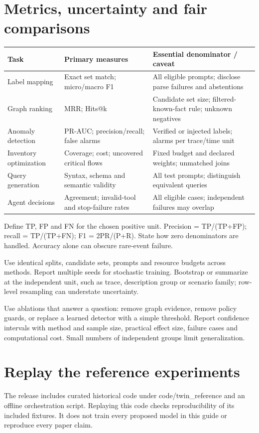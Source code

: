 \clearpage\section{Metrics, uncertainty and fair comparisons}
\begingroup\small\setlength{\tabcolsep}{5pt}\renewcommand{\arraystretch}{1.22}
\begin{tabularx}{\linewidth}{>{\raggedright\arraybackslash}X>{\raggedright\arraybackslash}X>{\raggedright\arraybackslash}X}
\toprule
\textbf{Task} & \textbf{Primary measures} & \textbf{Essential denominator / caveat}\\
\midrule
Label mapping & Exact set match; micro/macro F1 & All eligible prompts; disclose parse failures and abstentions\\
Graph ranking & MRR; Hits@k & Candidate set size; filtered-known-fact rule; unknown negatives\\
Anomaly detection & PR-AUC; precision/recall; false alarms & Verified or injected labels; alarms per trace/time unit\\
Inventory optimization & Coverage; cost; uncovered critical flows & Fixed budget and declared weights; unmatched joins\\
Query generation & Syntax, schema and semantic validity & All test prompts; distinguish equivalent queries\\
Agent decisions & Agreement; invalid-tool and stop-failure rates & All eligible cases; independent failures may overlap\\
\bottomrule\end{tabularx}\endgroup\par\medskip
Define TP, FP and FN for the chosen positive unit. Precision = TP/(TP+FP); recall = TP/(TP+FN); F1 = 2PR/(P+R). State how zero denominators are handled. Accuracy alone can obscure rare-event failure.

Use identical splits, candidate sets, prompts and resource budgets across methods. Report multiple seeds for stochastic training. Bootstrap or summarize at the independent unit, such as trace, description group or scenario family; row-level resampling can understate uncertainty.

Use ablations that answer a question: remove graph evidence, remove policy guards, or replace a learned detector with a simple threshold. Report confidence intervals with method and sample size, practical effect size, failure cases and computational cost. Small numbers of independent groups limit generalization.

\clearpage\section{Replay the reference experiments}
The release includes curated historical code under code/twin\_reference and an offline orchestration script. Replaying this code checks reproducibility of its included fixtures. It does not train every proposed model in this guide or reproduce every paper claim.


